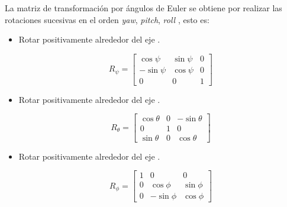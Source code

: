 La matriz de transformación por ángulos de Euler se obtiene por realizar las rotaciones sucesivas en el orden \textit{yaw}, \textit{pitch}, \textit{roll} \cite{multidrone2015modeling}, esto es:

\begin{itemize}
    \item {
        Rotar positivamente \jim{\psi} alrededor del eje .

        \begin{equation}
            \label{eq:euler-yaw}
            R_{\psi} = 
                \begin{bmatrix}
                    \cos{\psi} & \sin{\psi} & 0 \\
                    -\sin{\psi} & \cos{\psi} & 0 \\
                    0 & 0 & 1 
                \end{bmatrix}
        \end{equation}
    }

    \item {
        Rotar positivamente \jim{\theta} alrededor del eje .

        \begin{equation}
            \label{eq:euler-pitch}
            R_{\theta} = 
                \begin{bmatrix}
                    \cos{\theta} & 0 & -\sin{\theta} \\
                    0 & 1 & 0 \\
                    \sin{\theta} & 0 & \cos{\theta} 
                \end{bmatrix}
        \end{equation}
    }

    \item {
        Rotar positivamente \jim{\phi} alrededor del eje .

        \begin{equation}
            \label{eq:euler-roll}
            R_{\phi} = 
                \begin{bmatrix}
                    1 & 0 & 0 \\
                    0 & \cos{\phi}  & \sin{\phi} \\
                    0 & -\sin{\phi} & \cos{\phi} 
                \end{bmatrix}
        \end{equation}
    }
\end{itemize}


